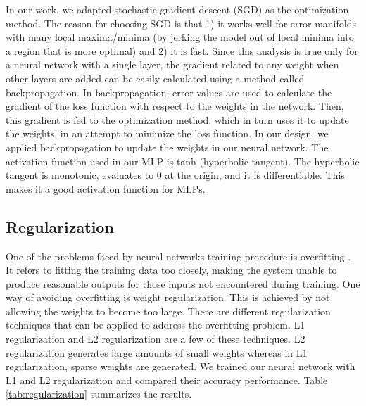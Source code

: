\documentclass[sigconf]{acmart}
\theoremstyle{plain}
\theoremstyle{remark}
\begin{document}
In our work, we adapted stochastic gradient descent (SGD) as the optimization method. The reason for choosing SGD is that 1) it works well for error manifolds with many local maxima/minima (by jerking the model out of local minima into a region that is more optimal) and 2) it is fast.  Since this analysis is true only for a neural network with a single layer, the gradient related to any weight when other layers are added can be easily calculated using a method called backpropagation. In backpropagation, error values are used to calculate the gradient of the loss function with respect to the weights in the network. Then, this gradient is fed to the optimization method, which in turn uses it to update the weights, in an attempt to minimize the loss function. In our design, we applied backpropagation to update the weights in our neural network. The activation function used in our MLP is tanh (hyperbolic tangent). The hyperbolic tangent is monotonic, evaluates to 0 at the origin, and it is differentiable. This makes it a good activation function for MLPs.

\subsection{Regularization} \label{regularization}
One of the problems faced by neural networks training procedure is overfitting \cite{overfitting}. It refers to fitting the training data too closely, making the system unable to produce reasonable outputs for those inputs not encountered during training. One way of avoiding overfitting is weight regularization. This is achieved by not allowing the weights to become too large. There are different regularization techniques that can be applied to address the overfitting problem. L1 regularization and L2 regularization are a few of these techniques. L2 regularization generates large amounts of small weights whereas in L1 regularization, sparse weights are generated. We trained our neural network with L1 and L2 regularization and compared their accuracy performance. Table \ref{tab:regularization} summarizes the results. 
\end{document}

